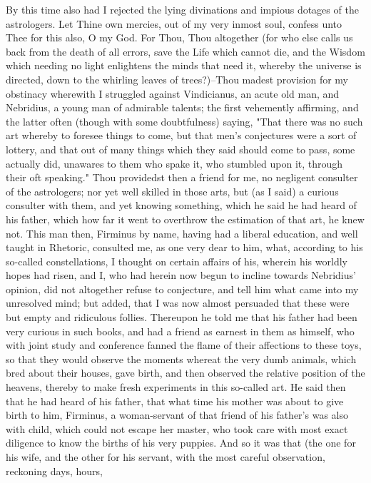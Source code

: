 \documentclass[b5paper,openright,12pt,twoside]{book}
\begin{document}
By this time also had I rejected the lying divinations and impious
dotages of the astrologers. Let Thine own mercies, out of my very
inmost soul, confess unto Thee for this also, O my God. For Thou, Thou
altogether (for who else calls us back from the death of all errors,
save the Life which cannot die, and the Wisdom which needing no light
enlightens the minds that need it, whereby the universe is directed,
down to the whirling leaves of trees?)--Thou madest provision for my
obstinacy wherewith I struggled against Vindicianus, an acute old man,
and Nebridius, a young man of admirable talents; the first vehemently
affirming, and the latter often (though with some doubtfulness) saying,
"That there was no such art whereby to foresee things to come, but that
men's conjectures were a sort of lottery, and that out of many things
which they said should come to pass, some actually did, unawares to them
who spake it, who stumbled upon it, through their oft speaking."
Thou providedst then a friend for me, no negligent consulter of the
astrologers; nor yet well skilled in those arts, but (as I said) a
curious consulter with them, and yet knowing something, which he said
he had heard of his father, which how far it went to overthrow the
estimation of that art, he knew not. This man then, Firminus by name,
having had a liberal education, and well taught in Rhetoric, consulted
me, as one very dear to him, what, according to his so-called
constellations, I thought on certain affairs of his, wherein his worldly
hopes had risen, and I, who had herein now begun to incline towards
Nebridius' opinion, did not altogether refuse to conjecture, and tell
him what came into my unresolved mind; but added, that I was now almost
persuaded that these were but empty and ridiculous follies. Thereupon he
told me that his father had been very curious in such books, and had
a friend as earnest in them as himself, who with joint study and
conference fanned the flame of their affections to these toys, so that
they would observe the moments whereat the very dumb animals, which bred
about their houses, gave birth, and then observed the relative position
of the heavens, thereby to make fresh experiments in this so-called art.
He said then that he had heard of his father, that what time his mother
was about to give birth to him, Firminus, a woman-servant of that friend
of his father's was also with child, which could not escape her master,
who took care with most exact diligence to know the births of his very
puppies. And so it was that (the one for his wife, and the other for his
servant, with the most careful observation, reckoning days, hours,
\end{document}
